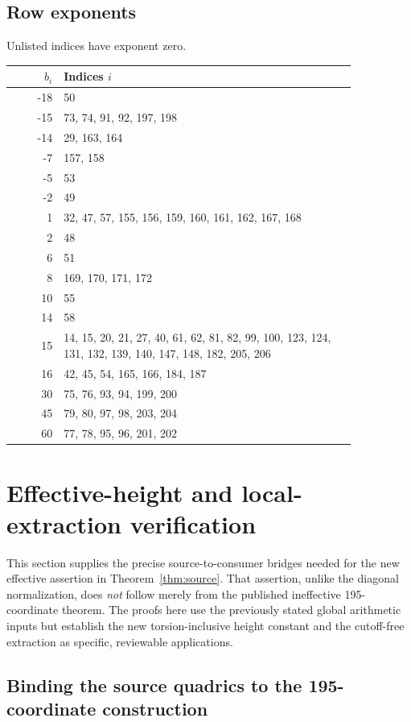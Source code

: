 \documentclass[11pt,a4paper]{article}
\begin{document}
\subsection*{Row exponents}
Unlisted indices have exponent zero.
\begin{longtable}{r p{0.85\linewidth}}
\toprule
$b_i$ & Indices $i$\\
\midrule
\endhead
-18 & 50\\
-15 & 73, 74, 91, 92, 197, 198\\
-14 & 29, 163, 164\\
-7 & 157, 158\\
-5 & 53\\
-2 & 49\\
1 & 32, 47, 57, 155, 156, 159, 160, 161, 162, 167, 168\\
2 & 48\\
6 & 51\\
8 & 169, 170, 171, 172\\
10 & 55\\
14 & 58\\
15 & 14, 15, 20, 21, 27, 40, 61, 62, 81, 82, 99, 100, 123, 124, 131, 132, 139, 140, 147, 148, 182, 205, 206\\
16 & 42, 45, 54, 165, 166, 184, 187\\
30 & 75, 76, 93, 94, 199, 200\\
45 & 79, 80, 97, 98, 203, 204\\
60 & 77, 78, 95, 96, 201, 202\\
\bottomrule
\end{longtable}


\section{Effective-height and local-extraction verification}
\label{sec:source-input-audit}

This section supplies the precise source-to-consumer bridges needed for
the new effective assertion in Theorem~\ref{thm:source}. That assertion,
unlike the diagonal normalization, does \emph{not} follow merely from
the published ineffective 195-coordinate theorem. The proofs here use
the previously stated global arithmetic inputs but establish the
new torsion-inclusive height constant and the cutoff-free extraction
as specific, reviewable applications.

\subsection{Binding the source quadrics to the 195-coordinate construction}
\end{document}
